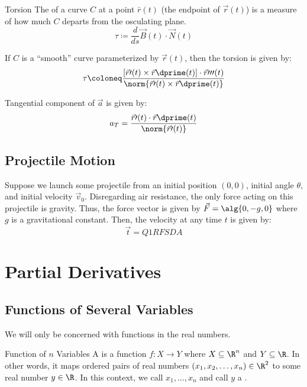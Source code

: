 \documentclass[math]{amznotes}
\begin{document}
\begin{dfnbox}{Torsion}{}
    The  of a curve $C$ at a point $\bar{r}(t)$ (the endpoint of $\vec{r}(t)$) is a measure of how much $C$ departs from the osculating plane.
    \[ \tau \coloneq \frac{d}{ds} \vec{B}(t) \cdot \vec{N}(t) \]
\end{dfnbox}

\begin{thmbox}{}{}
    If $C$ is a ``smooth'' curve parameterized by $\vec{r}(t)$, then the torsion is given by:
    \[ \tau \coloneq \frac{ \left[ \vec{r}\prime(t) \times \vec{r}\dprime(t) \right] \cdot \vec{r}\prime\prime\prime(t)}{\norm{\vec{r}\prime(t) \times \vec{r}\dprime(t)}} \]
\end{thmbox}

Tangential component of $\vec{a}$ is given by:
\[ a_T = \frac{\vec{r}\prime(t) \cdot \vec{r}\dprime(t)}{\norm{\vec{r}\prime(t)}} \]

\section{Projectile Motion}

Suppose we launch some projectile from an initial position $(0,0)$, initial angle $\theta$, and initial velocity $\vec{v}_0$. Disregarding air resistance, the only force acting on this projectile is gravity. Thus, the force vector is given by $\vec{F} = \alg{0, -g, 0}$ where $g$ is a gravitational constant. Then, the velocity at any time $t$ is given by:
\[ \vec{t} = Q1RFSDA \]

\chapter{Partial Derivatives}

\section{Functions of Several Variables}

We will only be concerned with functions in the real numbers.

\begin{dfnbox}{Function of $n$ Variables}{}
A  is a function $f : X \to Y$ where $X \subseteq \R^n$ and $Y \subseteq \R$. In other words, it maps ordered pairs of real numbers $(x_1, x_2, \ldots, x_n) \in \R^2$ to some real number $y \in \R$. In this context, we call $x_1, \ldots, x_n$  and call $y$ a .
\end{dfnbox}
\end{document}
